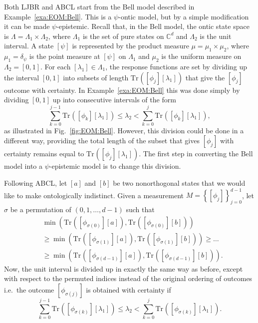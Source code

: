 \documentclass[DIV=calc,paper=a4,fontsize=11pt,twocolumn]{scrartcl} %
\theoremstyle{definition}
\theoremstyle{plain}
\newcommand{\Proj}[1]{\ensuremath{\left [ #1 \right ]}}
\newcommand{\Tr}[2][]{\ensuremath{\text{Tr}_{#1} \left ( #2 \right )}}
\begin{document}
Both LJBR and ABCL start from the Bell model described in
Example~\ref{exa:EOM:Bell}.  This is a $\psi$-ontic model, but by a
simple modification it can be made $\psi$-epistemic.  Recall that, in
the Bell model, the ontic state space is $\Lambda = \Lambda_1 \times
\Lambda_2$, where $\Lambda_1$ is the set of pure states on
$\mathbb{C}^d$ and $\Lambda_2$ is the unit interval.  A state
$\Proj{\psi}$ is represented by the product measure $\mu = \mu_1
\times \mu_2$, where $\mu_1 = \delta_{\psi}$ is the point
measure at $\Proj{\psi}$ on $\Lambda_1$ and $\mu_2$ is the uniform
measure on $\Lambda_2 = [0,1]$.  For each $[\lambda_1] \in \Lambda_1$,
the response functions are set by dividing up the interval $[0,1]$
into subsets of length $\Tr{\Proj{\phi_j}\Proj{\lambda_1}}$ that give
the $\Proj{\phi_j}$ outcome with certainty.  In
Example~\ref{exa:EOM:Bell} this was done simply by dividing $[0,1]$ up
into consecutive intervals of the form
\begin{equation}
\sum_{k=0}^{j-1} \Tr{\Proj{\phi_k}\Proj{\lambda_1}} \leq \lambda_2
< \sum_{k=0}^j \Tr{\Proj{\phi_k}\Proj{\lambda_1}},
\end{equation}
as illustrated in Fig.~\ref{fig:EOM:Bell}.  However, this division
could be done in a different way, providing the total length of the
subset that gives $\Proj{\phi_j}$ with certainty remains equal to
$\Tr{\Proj{\phi_j}\Proj{\lambda_1}}$.  The first step in converting
the Bell model into a $\psi$-epistemic model is to change this
division.

Following ABCL, let $\Proj{a}$ and $\Proj{b}$ be two nonorthogonal
states that we would like to make ontologically indistinct.  Given a
measurement $M = \left \{ \Proj{\phi_j} \right \}_{j=0}^{d-1}$, let
$\sigma$ be a permutation of $(0,1,\ldots,d-1)$ such that
\begin{align}
&\min \left ( \Tr{\Proj{\phi_{\sigma(0)}}\Proj{a}},
\Tr{\Proj{\phi_{\sigma(0)}}\Proj{b}} \right )\nonumber\\
& \geq \min \left ( \Tr{\Proj{\phi_{\sigma(1)}}\Proj{a}},
\Tr{\Proj{\phi_{\sigma(1)}}\Proj{b}} \right ) \geq \ldots \\
& \geq \min \left ( \Tr{\Proj{\phi_{\sigma(d-1)}}\Proj{a}},
\Tr{\Proj{\phi_{\sigma(d-1)}}\Proj{b}} \right ).
\end{align}
Now, the unit interval is divided up in exactly the same way as
before, except with respect to the permuted indices instead of the
original ordering of outcomes i.e.\ the outcome
$\Proj{\phi_{\sigma(j)}}$ is obtained with certainty if
\begin{equation}
\sum_{k=0}^{j-1} \Tr{\Proj{\phi_{\sigma(k)}}\Proj{\lambda_1}} \leq
\lambda_2 < \sum_{k=0}^j
\Tr{\Proj{\phi_{\sigma(k)}}\Proj{\lambda_1}}.
\end{equation}
\end{document}
